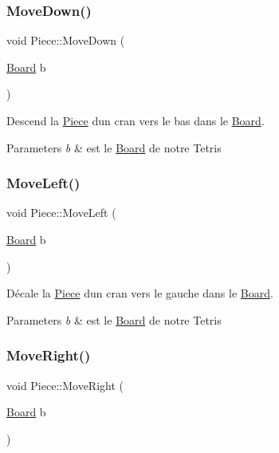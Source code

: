 \subsubsection{\texorpdfstring{Move\+Down()}{MoveDown()}}
{\footnotesize\ttfamily void Piece\+::\+Move\+Down (\begin{DoxyParamCaption}\item[{\hyperlink{classBoard}{Board}}]{b }\end{DoxyParamCaption})}



Descend la \hyperlink{classPiece}{Piece} d\textquotesingle{}un cran vers le bas dans le \hyperlink{classBoard}{Board}. 


\begin{DoxyParams}{Parameters}
{\em b} & est le \hyperlink{classBoard}{Board} de notre Tetris \\
\hline
\end{DoxyParams}
\mbox{\label{classPiece_a08f2bd761965092bd4f8f97c81aa6af8}} 
\subsubsection{\texorpdfstring{Move\+Left()}{MoveLeft()}}
{\footnotesize\ttfamily void Piece\+::\+Move\+Left (\begin{DoxyParamCaption}\item[{\hyperlink{classBoard}{Board}}]{b }\end{DoxyParamCaption})}



Décale la \hyperlink{classPiece}{Piece} d\textquotesingle{}un cran vers le gauche dans le \hyperlink{classBoard}{Board}. 


\begin{DoxyParams}{Parameters}
{\em b} & est le \hyperlink{classBoard}{Board} de notre Tetris \\
\hline
\end{DoxyParams}
\mbox{\label{classPiece_a938328bd15662dbf8d4bd66145e20e1a}} 
\subsubsection{\texorpdfstring{Move\+Right()}{MoveRight()}}
{\footnotesize\ttfamily void Piece\+::\+Move\+Right (\begin{DoxyParamCaption}\item[{\hyperlink{classBoard}{Board}}]{b }\end{DoxyParamCaption})}



